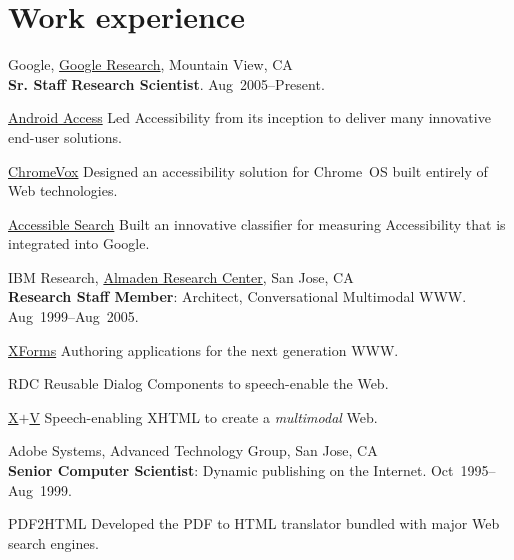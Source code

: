 \documentclass{article}
\begin{document}
\section*{Work experience}
\begin{compactitem}
  \item {Google},
  \href{http://www.google.com/search?q=\%22tv+raman\%22}{Google Research}, Mountain View, CA\\
  \textbf{Sr. Staff Research Scientist}.
\hfill Aug~2005--Present.
\begin{compactdesc}
\item[\href{http://eyes-free.googlecode.com}{Android Access}]  Led  Accessibility from its
inception to deliver many innovative end-user solutions.
\item[\href{http://google-axs-chrome.googlecode.com}{ChromeVox}]
Designed   an   accessibility
solution for Chrome~OS  built entirely of Web technologies.
\item[\href{http://labs.google.com/accessible}{Accessible Search}] Built an innovative classifier for
  measuring  Accessibility  that is integrated into Google.
  
\end{compactdesc}

\item {IBM Research},
\href{http://www.google.com/search?q=tv+raman+IBM+Almaden}{Almaden Research Center}, San Jose, CA\\
  \textbf{Research Staff Member}: Architect, Conversational
  Multimodal WWW\@. \hfill Aug~1999--Aug~2005.
\begin{compactdesc}
\item [\href{http://www.amazon.com/XForms-XML-Powered-Web-Forms/dp/0321154991}{XForms}] Authoring applications for the next generation
  WWW.\@
\item [RDC] Reusable Dialog Components to speech-enable the Web.

\item [\href{http://www.w3.org/tr/xml-events}{X$+$V}] Speech-enabling XHTML to create a \emph{multimodal\/}
  Web.
\end{compactdesc}
\item   {Adobe Systems},  {Advanced Technology Group}, San Jose, CA\\
  \textbf{Senior Computer Scientist}: Dynamic publishing on the
  Internet.  \hfill Oct~1995--Aug~1999.
\begin{compactdesc}
\item[PDF2HTML] Developed the PDF to HTML translator bundled with
  major Web search engines.
  

\end{compactdesc}
\end{compactitem}
\end{document}
